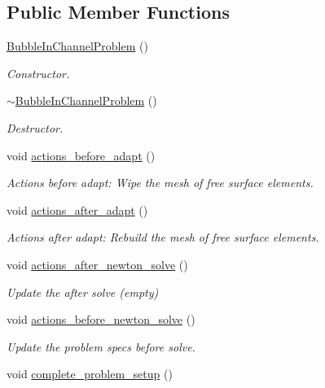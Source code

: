 \subsection*{Public Member Functions}
\begin{DoxyCompactItemize}
\item 
\hyperlink{classBubbleInChannelProblem_a04bf2f20c65e85228fac381d786bedad}{Bubble\+In\+Channel\+Problem} ()
\begin{DoxyCompactList}\small\item\em Constructor. \end{DoxyCompactList}\item 
\hyperlink{classBubbleInChannelProblem_a7a048a26898571d0f109df2a11f08eb7}{$\sim$\+Bubble\+In\+Channel\+Problem} ()
\begin{DoxyCompactList}\small\item\em Destructor. \end{DoxyCompactList}\item 
void \hyperlink{classBubbleInChannelProblem_aae0753340720453a44622c4dbb8807fb}{actions\+\_\+before\+\_\+adapt} ()
\begin{DoxyCompactList}\small\item\em Actions before adapt\+: Wipe the mesh of free surface elements. \end{DoxyCompactList}\item 
void \hyperlink{classBubbleInChannelProblem_a67d2650bfca3775800784379938a35bc}{actions\+\_\+after\+\_\+adapt} ()
\begin{DoxyCompactList}\small\item\em Actions after adapt\+: Rebuild the mesh of free surface elements. \end{DoxyCompactList}\item 
void \hyperlink{classBubbleInChannelProblem_a566685b0a4f5dda91adbf9c781f9eafb}{actions\+\_\+after\+\_\+newton\+\_\+solve} ()
\begin{DoxyCompactList}\small\item\em Update the after solve (empty) \end{DoxyCompactList}\item 
void \hyperlink{classBubbleInChannelProblem_aef53cd0e961bd899e50806ec39f5a3fd}{actions\+\_\+before\+\_\+newton\+\_\+solve} ()
\begin{DoxyCompactList}\small\item\em Update the problem specs before solve. \end{DoxyCompactList}\item 
void \hyperlink{classBubbleInChannelProblem_a7b3c042477f4ee4e62dd1e00e1a480f8}{complete\+\_\+problem\+\_\+setup} ()

\end{DoxyCompactItemize}
